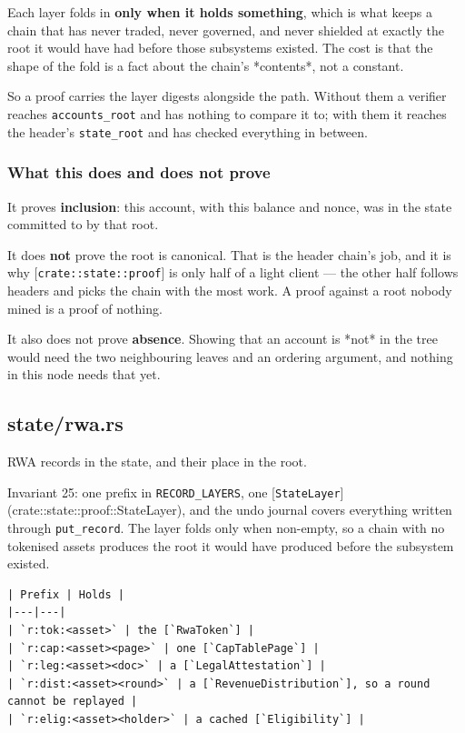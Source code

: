 \documentclass[11pt,a4paper]{article}
\begin{document}
Each layer folds in \textbf{only when it holds something}, which is what keeps a
chain that has never traded, never governed, and never shielded at exactly
the root it would have had before those subsystems existed. The cost is that
the shape of the fold is a fact about the chain's *contents*, not a constant.

So a proof carries the layer digests alongside the path. Without them a
verifier reaches \texttt{accounts\_root} and has nothing to compare it to; with them
it reaches the header's \texttt{state\_root} and has checked everything in between.

\subsubsection{What this does and does not prove}

It proves \textbf{inclusion}: this account, with this balance and nonce, was in
the state committed to by that root.

It does \textbf{not} prove the root is canonical. That is the header chain's job,
and it is why [\texttt{crate::state::proof}] is only half of a light client — the
other half follows headers and picks the chain with the most work. A proof
against a root nobody mined is a proof of nothing.

It also does not prove \textbf{absence}. Showing that an account is *not* in the
tree would need the two neighbouring leaves and an ordering argument, and
nothing in this node needs that yet.

\subsection{state/rwa.rs}
RWA records in the state, and their place in the root.

Invariant 25: one prefix in \texttt{RECORD\_LAYERS}, one
[\texttt{StateLayer}](crate::state::proof::StateLayer), and the
undo journal covers everything written through \texttt{put\_record}. The layer folds
only when non-empty, so a chain with no tokenised assets produces the root
it would have produced before the subsystem existed.

\begin{verbatim}
| Prefix | Holds |
|---|---|
| `r:tok:<asset>` | the [`RwaToken`] |
| `r:cap:<asset><page>` | one [`CapTablePage`] |
| `r:leg:<asset><doc>` | a [`LegalAttestation`] |
| `r:dist:<asset><round>` | a [`RevenueDistribution`], so a round cannot be replayed |
| `r:elig:<asset><holder>` | a cached [`Eligibility`] |
\end{verbatim}
\end{document}
